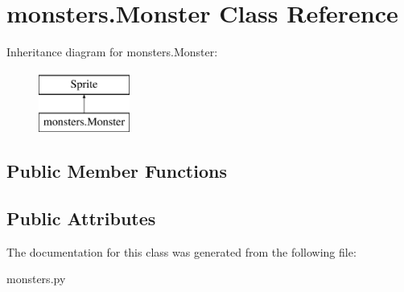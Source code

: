 \hypertarget{classmonsters_1_1_monster}{}\section{monsters.\+Monster Class Reference}
\label{classmonsters_1_1_monster}
Inheritance diagram for monsters.\+Monster\+:\begin{figure}[H]
\begin{center}
\leavevmode
\includegraphics[height=2.000000cm]{classmonsters_1_1_monster}
\end{center}
\end{figure}
\subsection*{Public Member Functions}
\begin{DoxyCompactItemize}
\end{DoxyCompactItemize}
\subsection*{Public Attributes}
\begin{DoxyCompactItemize}
\end{DoxyCompactItemize}


The documentation for this class was generated from the following file\+:\begin{DoxyCompactItemize}
\item 
monsters.\+py\end{DoxyCompactItemize}
